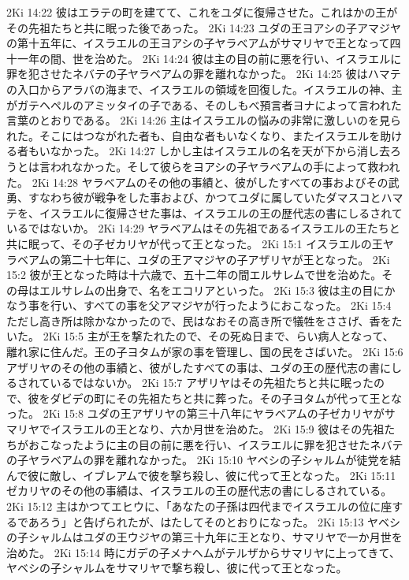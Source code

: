 2Ki 14:22  彼はエラテの町を建てて、これをユダに復帰させた。これはかの王がその先祖たちと共に眠った後であった。
2Ki 14:23  ユダの王ヨアシの子アマジヤの第十五年に、イスラエルの王ヨアシの子ヤラべアムがサマリヤで王となって四十一年の間、世を治めた。
2Ki 14:24  彼は主の目の前に悪を行い、イスラエルに罪を犯させたネバテの子ヤラベアムの罪を離れなかった。
2Ki 14:25  彼はハマテの入口からアラバの海まで、イスラエルの領域を回復した。イスラエルの神、主がガテヘペルのアミッタイの子である、そのしもべ預言者ヨナによって言われた言葉のとおりである。
2Ki 14:26  主はイスラエルの悩みの非常に激しいのを見られた。そこにはつながれた者も、自由な者もいなくなり、またイスラエルを助ける者もいなかった。
2Ki 14:27  しかし主はイスラエルの名を天が下から消し去ろうとは言われなかった。そして彼らをヨアシの子ヤラベアムの手によって救われた。
2Ki 14:28  ヤラベアムのその他の事績と、彼がしたすべての事およびその武勇、すなわち彼が戦争をした事および、かつてユダに属していたダマスコとハマテを、イスラエルに復帰させた事は、イスラエルの王の歴代志の書にしるされているではないか。
2Ki 14:29  ヤラベアムはその先祖であるイスラエルの王たちと共に眠って、その子ゼカリヤが代って王となった。
2Ki 15:1  イスラエルの王ヤラベアムの第二十七年に、ユダの王アマジヤの子アザリヤが王となった。
2Ki 15:2  彼が王となった時は十六歳で、五十二年の間エルサレムで世を治めた。その母はエルサレムの出身で、名をエコリアといった。
2Ki 15:3  彼は主の目にかなう事を行い、すべての事を父アマジヤが行ったようにおこなった。
2Ki 15:4  ただし高き所は除かなかったので、民はなおその高き所で犠牲をささげ、香をたいた。
2Ki 15:5  主が王を撃たれたので、その死ぬ日まで、らい病人となって、離れ家に住んだ。王の子ヨタムが家の事を管理し、国の民をさばいた。
2Ki 15:6  アザリヤのその他の事績と、彼がしたすべての事は、ユダの王の歴代志の書にしるされているではないか。
2Ki 15:7  アザリヤはその先祖たちと共に眠ったので、彼をダビデの町にその先祖たちと共に葬った。その子ヨタムが代って王となった。
2Ki 15:8  ユダの王アザリヤの第三十八年にヤラベアムの子ゼカリヤがサマリヤでイスラエルの王となり、六か月世を治めた。
2Ki 15:9  彼はその先祖たちがおこなったように主の目の前に悪を行い、イスラエルに罪を犯させたネバテの子ヤラベアムの罪を離れなかった。
2Ki 15:10  ヤベシの子シャルムが徒党を結んで彼に敵し、イブレアムで彼を撃ち殺し、彼に代って王となった。
2Ki 15:11  ゼカリヤのその他の事績は、イスラエルの王の歴代志の書にしるされている。
2Ki 15:12  主はかつてエヒウに、「あなたの子孫は四代までイスラエルの位に座するであろう」と告げられたが、はたしてそのとおりになった。
2Ki 15:13  ヤベシの子シャルムはユダの王ウジヤの第三十九年に王となり、サマリヤで一か月世を治めた。
2Ki 15:14  時にガデの子メナヘムがテルザからサマリヤに上ってきて、ヤベシの子シャルムをサマリヤで撃ち殺し、彼に代って王となった。
